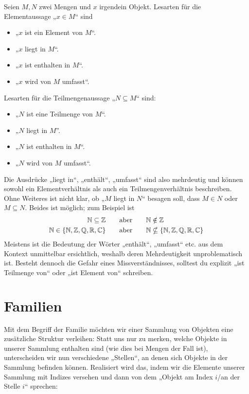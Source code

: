 \begin{nota}
    Seien $M,N$ zwei Mengen und $x$ irgendein Objekt. Lesarten für die Elementaussage „$x\in M$“ sind
    \begin{itemize}
        \item „$x$ ist ein Element von $M$“.
        \item „$x$ liegt in $M$“.
        \item „$x$ ist enthalten in $M$“.
        \item „$x$ wird von $M$ umfasst“.
    \end{itemize}
    Lesarten für die Teilmengenaussage „$N\subseteq M$“ sind:
    \begin{itemize}
        \item „$N$ ist eine Teilmenge von $M$“.
        \item „$N$ liegt in $M$”.
        \item „$N$ ist enthalten in $M$“.
        \item „$N$ wird von $M$ umfasst“.
    \end{itemize}
    Die Ausdrücke „liegt in“, „enthält“, „umfasst“ sind also mehrdeutig und können sowohl ein Elementverhältnis als auch ein Teilmengenverhältnis beschreiben. Ohne Weiteres ist nicht klar, ob „$M$ liegt in $N$“ besagen soll, dass $M\in N$ oder $M\subseteq N$. Beides ist möglich; zum Beispiel ist
    \begin{align*}
        \mathbb N \subseteq \mathbb Z \qquad & \text{aber}\qquad \mathbb N \notin \mathbb Z \\
        \mathbb N \in \{ \mathbb N,\mathbb Z,\mathbb Q,\mathbb R,\mathbb C\} \qquad & \text{aber}\qquad \mathbb N \nsubseteq  \{ \mathbb N,\mathbb Z,\mathbb Q,\mathbb R,\mathbb C\}
    \end{align*}
    Meistens ist die Bedeutung der Wörter „enthält“, „umfasst“ etc. aus dem Kontext unmittelbar ersichtlich, weshalb deren Mehrdeutigkeit unproblematisch ist. Besteht dennoch die Gefahr eines Missverständnisses, solltest du explizit „ist Teilmenge von“ oder „ist Element von“ schreiben.
\end{nota}





\section{Familien}


Mit dem Begriff der Familie möchten wir einer Sammlung von Objekten eine zusätzliche Struktur verleihen: Statt uns nur zu merken, welche Objekte in unserer Sammlung enthalten sind (wie dies bei Mengen der Fall ist), unterscheiden wir nun verschiedene „Stellen“, an denen sich Objekte in der Sammlung befinden können. Realisiert wird das, indem wir die Elemente unserer Sammlung mit Indizes versehen und dann von dem „Objekt am Index $i$/an der Stelle $i$“ sprechen:


